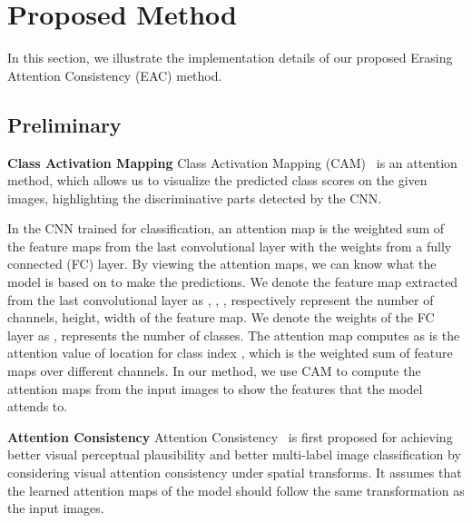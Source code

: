 \documentclass[runningheads]{llncs}
\begin{document}
\section{Proposed Method}
In this section, we illustrate the implementation details of our proposed Erasing Attention Consistency (EAC) method.
\subsection{Preliminary}
\noindent\textbf{Class Activation Mapping} Class Activation Mapping (CAM)~\cite{zhou2016cvpr} is an attention method, which allows us to visualize the predicted class scores on the given images, highlighting the discriminative parts detected by the CNN. 




In the CNN trained for classification, an attention map is the weighted sum of the feature maps from the last convolutional layer with the weights from a fully connected (FC) layer. By viewing the attention maps, we can know what the model is based on to make the predictions. We denote the feature map extracted from the last convolutional layer as , , ,  respectively represent the number of channels, height, width of the feature map. We denote the weights of the FC layer as ,  represents the number of classes. The attention map computes as 
 is the attention value of location  for class index , which is the weighted sum of feature maps over different channels. In our method, we use CAM to compute the attention maps from the input images to show the features that the model attends to.



\noindent\textbf{Attention Consistency} Attention Consistency~\cite{guo2019visual} is first proposed for achieving better visual perceptual plausibility and better multi-label image classification by considering visual attention consistency under spatial transforms. It assumes that the learned attention maps of the model should follow the same transformation as the input images.
\end{document}
